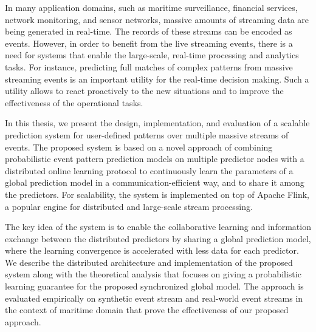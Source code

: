 
\par In many application domains, such as maritime surveillance, financial services, network monitoring, and sensor networks, massive amounts of streaming data are being generated in real-time. The records of these streams can be encoded as events. However, in order to benefit from the live streaming events, there is a need for systems that enable the large-scale, real-time processing and analytics tasks. For instance, predicting full matches of complex patterns from massive streaming events is an important utility for the real-time decision making. Such a utility allows to react proactively to the new situations and to improve the effectiveness of the operational tasks.

\par In this thesis, we present the design, implementation, and evaluation of a scalable prediction system for user-defined patterns over multiple massive streams of events. The proposed system is based on a novel approach of combining probabilistic event pattern prediction models on multiple predictor nodes with a distributed online learning protocol to continuously learn the parameters of a global prediction model in a communication-efficient way, and to share it among the predictors. For  scalability, the system is implemented on top of Apache Flink, a popular engine for distributed and large-scale stream processing.



\par  The key idea of the system is to enable the collaborative learning and information exchange between the distributed predictors by sharing a global prediction model, where the learning convergence is accelerated with less data for each predictor. We describe the distributed architecture and implementation of the proposed system along with the theoretical analysis that focuses on giving a probabilistic learning guarantee for the proposed synchronized global model.
The approach is evaluated empirically on synthetic event stream and real-world event streams in the context of maritime domain that prove the effectiveness of our proposed approach.



